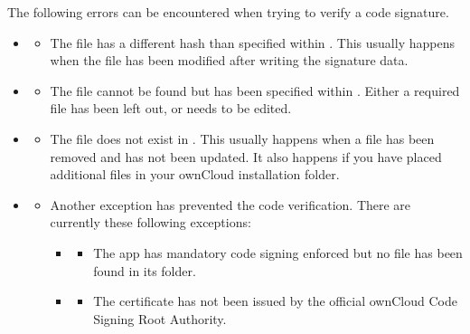 \documentclass[letterpaper,10pt,english]{sphinxmanual}
\begin{document}
The following errors can be encountered when trying to verify a code signature.
\begin{itemize}
\item {} 
\begin{itemize}
\item {} 
The file has a different hash than specified within . This
usually happens when the file has been modified after writing the signature
data.

\end{itemize}

\item {} 
\begin{itemize}
\item {} 
The file cannot be found but has been specified within .
Either a required file has been left out, or  needs to be
edited.

\end{itemize}

\item {} 
\begin{itemize}
\item {} 
The file does not exist in . This usually happens when a
file has been removed and  has not been updated. It also
happens if you have placed additional files in your ownCloud installation
folder.

\end{itemize}

\item {} 
\begin{itemize}
\item {} 
Another exception has prevented the code verification. There are currently
these following exceptions:
\begin{itemize}
\item {} 
\begin{itemize}
\item {} 
The app has mandatory code signing enforced but no 
file has been found in its  folder.

\end{itemize}

\item {} 
\begin{itemize}
\item {} 
The certificate has not been issued by the official ownCloud Code
Signing Root Authority.


\end{itemize}
\end{itemize}
\end{itemize}
\end{itemize}
\end{document}
